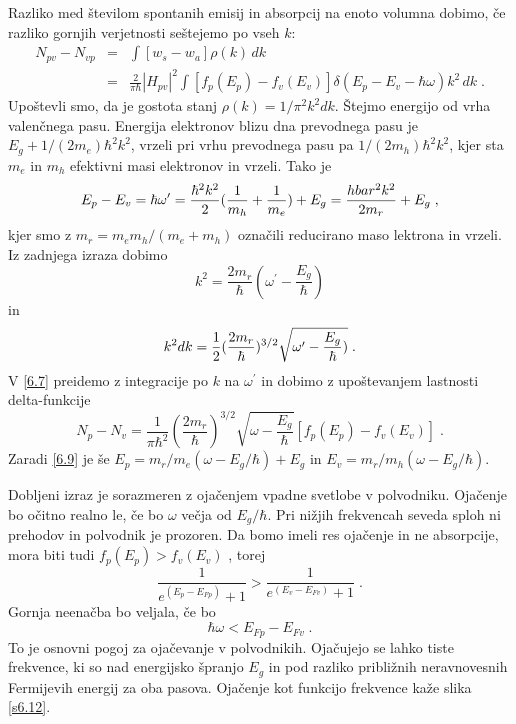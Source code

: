 Razliko med številom spontanih emisij in absorpcij na enoto volumna dobimo,
če razliko gornjih verjetnosti seštejemo po vseh $k$: 
\begin{eqnarray}  \label{6.7}
N_{pv}-N_{vp}&=&\int[w_s-w_a]\rho(k)\,dk  \nonumber \\
&=&\frac{2}{\pi\hbar}|H_{pv}|^2 \int[f_p(E_p)-f_v(E_v)]
\delta(E_p-E_v-\hbar\omega) k^2\,dk\;.
\end{eqnarray}
Upoštevli smo, da je gostota stanj $\rho(k)=1/\pi^2 k^2dk$. Štejmo
energijo od vrha valenčnega pasu. Energija elektronov blizu dna prevodnega
pasu je $E_g+1/(2m_e)\hbar^2 k^2$, vrzeli pri vrhu prevodnega pasu pa $%
1/(2m_h)\hbar^2 k^2$, kjer sta $m_e$ in $m_h$ efektivni masi elektronov in
vrzeli. Tako je 
\begin{equation}  \label{6.8}
E_p-E_v=\hbar\omega^{\prime}=\frac{\hbar^2 k^2}{2}(\frac{1}{m_h}+ \frac{1}{%
m_e})+E_g=\frac{hbar^2 k^2}{2m_r}+E_g\;,
\end{equation}
kjer smo z $m_r=m_e m_h/(m_e+m_h)$ označili reducirano maso lektrona in
vrzeli. Iz zadnjega izraza dobimo 
\begin{equation}  \label{6.9}
k^2=\frac{2m_r}{\hbar}(\omega^{\prime}-\frac{E_g}{\hbar})
\end{equation}
in 
\begin{equation}  \label{6.10}
k^2dk=\frac{1}{2}(\frac{2m_r}{\hbar})^{3/2}\sqrt{\omega^{\prime}- \frac{E_g}{%
\hbar})}\;.
\end{equation}
V \ref{6.7} preidemo z integracije po $k$ na $\omega^{\prime}$ in dobimo z
upoštevanjem lastnosti delta-funkcije 
\begin{equation}  \label{6.11}
N_p-N_v=\frac{1}{\pi\hbar^2}(\frac{2m_r}{\hbar})^{3/2} \sqrt{\omega-\frac{E_g%
}{\hbar}}[f_p(E_p)-f_v(E_v)]\;.
\end{equation}
Zaradi \ref{6.9} je še $E_p=m_r/m_e(\omega-E_g/\hbar)+E_g$ in $%
E_v=m_r/m_h(\omega-E_g/\hbar)$.

Dobljeni izraz je sorazmeren z ojačenjem vpadne svetlobe v polvodniku.
Ojačenje bo očitno realno le, če bo $\omega$ večja od $E_g/\hbar$. Pri
nižjih frekvencah seveda sploh ni prehodov in polvodnik je prozoren. Da
bomo imeli res ojačenje in ne absorpcije, mora biti tudi $f_p(E_p)>f_v(E_v)$%
, torej 
\begin{equation}  \label{6.12}
\frac{1}{e^{(E_p-E_{Fp})}+1}>\frac{1}{e^{(E_v-E_{Fv})}+1}\;.
\end{equation}
Gornja neenačba bo veljala, če bo 
\begin{equation}  \label{6.13}
\hbar\omega<E_{Fp}-E_{Fv}\;.
\end{equation}
To je osnovni pogoj za ojačevanje v polvodnikih. Ojačujejo se lahko tiste
frekvence, ki so nad energijsko špranjo $E_g$ in pod razliko približnih
neravnovesnih Fermijevih energij za oba pasova. Ojačenje kot funkcijo
frekvence kaže slika \ref{s6.12}.

